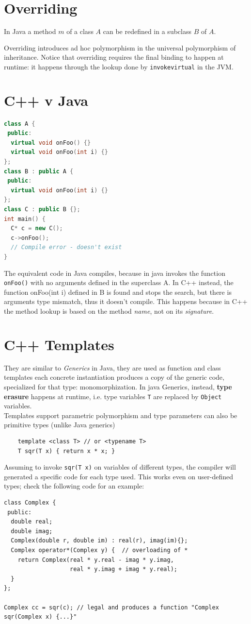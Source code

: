 \section{Overriding}
In Java a method $m$ of a
class $A$ can be redefined
in a subclass $B$ of $A$.

Overriding introduces ad hoc polymorphism in the universal polymorphism of inheritance.
Notice that overriding requires the final binding to happen at runtime:
it happens through the lookup done by \lstinline{invokevirtual} in the JVM.

\section{C++ v Java}
\begin{lstlisting}[language=C++]
class A {
 public:
  virtual void onFoo() {}
  virtual void onFoo(int i) {}
};
class B : public A {
 public:
  virtual void onFoo(int i) {}
};
class C : public B {};
int main() {
  C* c = new C();
  c->onFoo();
  // Compile error - doesn't exist
}
\end{lstlisting}
The equivalent code in Java compiles, because in java invokes the function \lstinline{onFoo()} with no arguments defined in the superclass A.
In C++ instead, the function onFoo(int i) defined in B is found and stops the search, but there is arguments type mismatch, thus it doesn't compile.
This happens because in C++ the method lookup is based on the method \textit{name}, not on its \textit{signature}.

\section{C++ Templates}
\lstset{language=C++}

They are similar to \textit{Generics} in Java, 
they are used as function and class templates
each concrete instantiation produces a copy of the generic code, specialized for that type:
monomorphization.
In java Generics, instead, \textbf{type erasure} happens at runtime, i.e. type variables \lstinline{T} are replaced by \lstinline{Object} variables.\\
Templates support parametric polymorphism and type parameters can also be primitive types (unlike Java generics)
\begin{lstlisting}
    template <class T> // or <typename T>
    T sqr(T x) { return x * x; }
\end{lstlisting}
Assuming to invoke \lstinline{sqr(T x)} on variables of different types, the compiler will generated a specific code for each type used.
This works even on user-defined types;
check the following code for an example:
\begin{lstlisting}
class Complex {
 public:
  double real;
  double imag;
  Complex(double r, double im) : real(r), imag(im){};
  Complex operator*(Complex y) {  // overloading of *
    return Complex(real * y.real - imag * y.imag,
                   real * y.imag + imag * y.real);
  }
};

Complex cc = sqr(c); // legal and produces a function "Complex sqr(Complex x) {...}"
\end{lstlisting}

